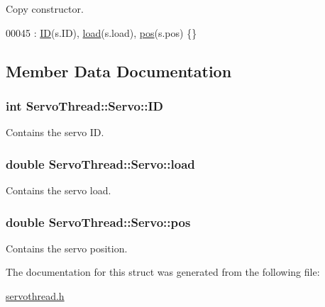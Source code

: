 Copy constructor. 


\begin{DoxyCode}
00045 : \hyperlink{a00007_a06b514c42113aa85fd1703fc88fca7ce}{ID}(s.ID), \hyperlink{a00007_ae378d77acf16b306649c87fdb8df677e}{load}(s.load), \hyperlink{a00007_a9fa0aa56944b9b0bb9d66303d5bd4b59}{pos}(s.pos) \{\}
\end{DoxyCode}


\subsection{Member Data Documentation}
\hypertarget{a00007_a06b514c42113aa85fd1703fc88fca7ce}{}
\subsubsection[{I\+D}]{\setlength{\rightskip}{0pt plus 5cm}int Servo\+Thread\+::\+Servo\+::\+I\+D}\label{a00007_a06b514c42113aa85fd1703fc88fca7ce}


Contains the servo I\+D. 

\hypertarget{a00007_ae378d77acf16b306649c87fdb8df677e}{}
\subsubsection[{load}]{\setlength{\rightskip}{0pt plus 5cm}double Servo\+Thread\+::\+Servo\+::load}\label{a00007_ae378d77acf16b306649c87fdb8df677e}


Contains the servo load. 

\hypertarget{a00007_a9fa0aa56944b9b0bb9d66303d5bd4b59}{}
\subsubsection[{pos}]{\setlength{\rightskip}{0pt plus 5cm}double Servo\+Thread\+::\+Servo\+::pos}\label{a00007_a9fa0aa56944b9b0bb9d66303d5bd4b59}


Contains the servo position. 



The documentation for this struct was generated from the following file\+:\begin{DoxyCompactItemize}
\item 
\hyperlink{a00021}{servothread.\+h}\end{DoxyCompactItemize}
